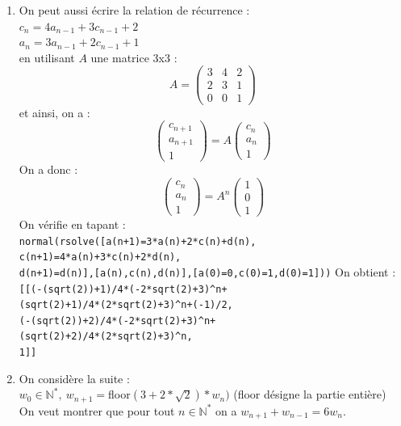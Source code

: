 \documentclass[a4paper,11pt]{book}
\newcommand{\N}{{\mathbb{N}}}
\begin{document}
\begin{enumerate}
\item On peut aussi \'ecrire la relation de r\'ecurrence :\\
$c_n=4a_{n-1}+3c_{n-1}+2$\\ 
$a_n=3a_{n-1}+2c_{n-1}+1$\\
en utilisant $A$ une matrice 3x3 :
$$ 
A=\left(
\begin{array}{ccc}
3&4&2\\
2&3&1\\
0&0&1
\end{array}
\right)
$$
et ainsi, on a :\\
$$
\left(
\begin{array}{c}
c_{n+1}\\
a_{n+1}\\
1
\end{array}
\right)
=A
\left(
\begin{array}{c}
c_n\\
a_n\\
1
\end{array}
\right)
$$
On a donc :\\
$$
\left(
\begin{array}{c}
c_n\\
a_n\\
1
\end{array}
\right)
=A^n
\left(
\begin{array}{c}
1\\
0\\
1
\end{array}
\right)
$$
On v\'erifie en tapant :\\
{\tt normal(rsolve([a(n+1)=3*a(n)+2*c(n)+d(n),\\
c(n+1)=4*a(n)+3*c(n)+2*d(n),\\
d(n+1)=d(n)],[a(n),c(n),d(n)],[a(0)=0,c(0)=1,d(0)=1]))}
On obtient :\\
{\tt [[(-(sqrt(2))+1)/4*(-2*sqrt(2)+3)\verb|^|n+\\
(sqrt(2)+1)/4*(2*sqrt(2)+3)\verb|^|n+(-1)/2,\\
(-(sqrt(2))+2)/4*(-2*sqrt(2)+3)\verb|^|n+\\(sqrt(2)+2)/4*(2*sqrt(2)+3)\verb|^|n,\\
1]]}
\item On consid\`ere la suite :\\
$w_0\in \N^*,\ w_{n+1}=$floor$(3+2*\sqrt 2)*w_n)$ (floor d\'esigne la partie 
enti\`ere)\\
On veut montrer que pour tout $n\in \N^*$ on a $w_{n+1}+w_{n-1}=6w_n$.\\

\end{enumerate}
\end{document}
